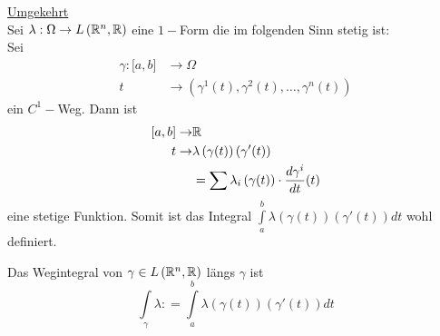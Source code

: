 \noindent\underline{Umgekehrt}\\

\noindent Sei $\lambda :\Omega\to L\left( \mathbb{R}^n,\mathbb{R}\right)$ eine $1-$Form die im folgenden Sinn stetig ist: \\

Sei
\begin{align*}
\gamma :\lbrack a,b\rbrack &\to\Omega\\
t &\to\left( \gamma^1 (t), \gamma^2 (t),\dots ,\gamma^n (t) \right)
\end{align*}
ein $C^1-$Weg. Dann ist
\begin{align*}
\lbrack a,b\rbrack \to &\mathbb{R}\\
t\to &\lambda\left( \gamma (t)\right)\left( \gamma' (t)\right)\\
& = \sum{\lambda_i\left(\gamma(t)\right)\cdot\frac{d\gamma^i}{dt}(t)}
\end{align*}
eine stetige Funktion. Somit ist das Integral $\int\limits_a^b {\lambda \left( {\gamma \left( t \right)} \right)\left( {\gamma '\left( t \right)} \right)dt} $ wohl definiert.

\begin{definition}{8.36}
Das Wegintegral von $\gamma\in L\left( \mathbb{R}^n,\mathbb{R}\right)$ längs $\gamma$ ist \[\int\limits_\gamma  \lambda  : = \int\limits_a^b {\lambda \left( {\gamma (t)} \right)\left( {\gamma '(t)} \right)dt} \]
\end{definition}

